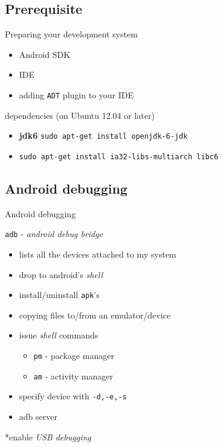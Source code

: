 \documentclass{beamer}
\begin{document}
\subsection{Prerequisite}
\begin{frame}{Preparing your development system}
  \begin{block}{}
    \begin{itemize}
      \item Android SDK
      \item IDE
      \item adding {\tt ADT} plugin to your IDE
    \end{itemize}
  \end{block}

  \begin{block}{dependencies (on Ubuntu 12.04 or later)}
    \begin{itemize}
    \item {\bf jdk6} {\tt sudo apt-get install openjdk-6-jdk} \pause
    \item {\tt sudo apt-get install ia32-libs-multiarch libc6}
    \end{itemize}
  \end{block}
\end{frame}

\subsection{Android debugging}
\begin{frame}{Android debugging}
  
  \begin{block}{{\tt adb} - {\em android debug bridge}}
    \begin{itemize}
      
      \item lists all the devices attached to my system\pause
      \item drop to android's {\em shell} \pause
      \item install/uninstall {\tt apk}'s \pause
      \item copying files to/from an emulator/device \pause
      \item issue {\em shell} commands \pause
        \begin{itemize}
        \item {\tt pm} - package manager 
        \item {\tt am} - activity manager
        \end{itemize} \pause
      \item specify device with {\tt -d,-e,-s} \pause
      \item adb server
    \end{itemize}
  \end{block}
  \pause
  *enable {\em USB debugging}
\end{frame}
\end{document}

